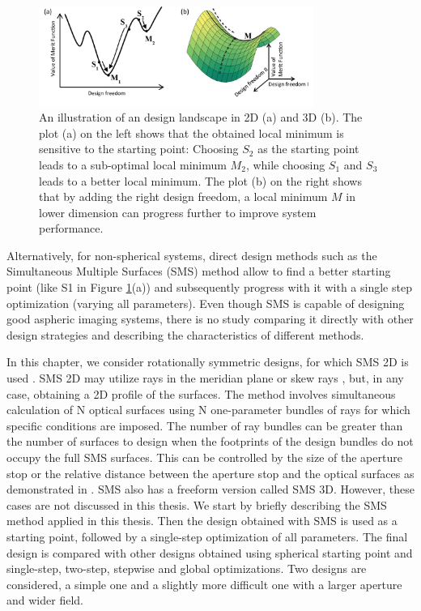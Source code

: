 \begin{figure}[h!]
    \centering
    \includegraphics[width=0.8\textwidth]{chapter-5/figures/Figure1_landscape.png}
    \caption{An illustration of an design landscape in 2D (a) and 3D (b). The plot (a) on the left shows that the obtained local minimum is sensitive to the starting point: Choosing $S_2$ as the starting point leads to a sub-optimal local minimum $M_2$, while choosing $S_1$ and $S_3$ leads to a better local minimum. The plot (b) on the right shows that by adding the right design freedom, a local minimum $M$ in lower dimension can progress further to improve system performance.}
    
    \label{fig: fig1_landscape}
\end{figure}
Alternatively, for non-spherical systems, direct design methods such as the Simultaneous Multiple Surfaces (SMS) method allow to find a better starting point (like S1 in Figure \ref{fig: fig1_landscape}(a)) \cite{WangThesis}\cite{LinWang12OE} and subsequently progress with it with a single step optimization (varying all parameters). Even though SMS is capable of designing good aspheric imaging systems, there is no study comparing it directly with other design strategies and describing the characteristics of different methods.

In this chapter, we consider rotationally symmetric designs, for which SMS 2D is used \cite{book:ChavesNonimagingOptics}. SMS 2D may utilize rays in the meridian plane or skew rays \cite{LinWang2011}, but, in any case, obtaining a 2D profile of the surfaces. The method involves simultaneous calculation of N optical surfaces using N one-parameter bundles of rays for which specific conditions are imposed. The number of ray bundles can be greater than the number of surfaces to design when the footprints of the design bundles do not occupy the full SMS surfaces. This can be controlled by the size of the aperture stop or the relative distance between the aperture stop and the optical surfaces as demonstrated in \cite{BenitezSPIE2014}\cite{FDuerrOE2013}\cite{FDuerrOE12}. SMS also has a freeform version called SMS 3D. However, these cases are not discussed in this thesis. 
We start by briefly describing the SMS method applied in this thesis. Then the design obtained with SMS is used as a starting point, followed by a single-step optimization of all parameters. The final design is compared with other designs obtained using spherical starting point and single-step, two-step, stepwise and global optimizations. Two designs are considered, a simple one and a slightly more difficult one with a larger aperture and wider field.
